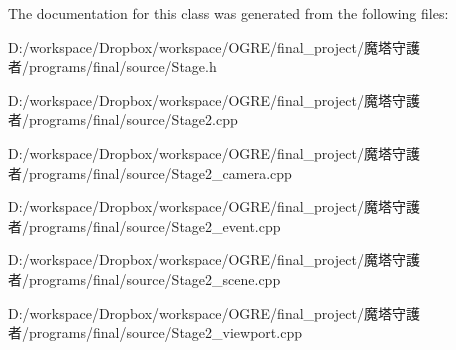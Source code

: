 The documentation for this class was generated from the following files:\begin{DoxyCompactItemize}
\item 
D:/workspace/Dropbox/workspace/OGRE/final\_\-project/魔塔守護者/programs/final/source/Stage.h\item 
D:/workspace/Dropbox/workspace/OGRE/final\_\-project/魔塔守護者/programs/final/source/Stage2.cpp\item 
D:/workspace/Dropbox/workspace/OGRE/final\_\-project/魔塔守護者/programs/final/source/Stage2\_\-camera.cpp\item 
D:/workspace/Dropbox/workspace/OGRE/final\_\-project/魔塔守護者/programs/final/source/Stage2\_\-event.cpp\item 
D:/workspace/Dropbox/workspace/OGRE/final\_\-project/魔塔守護者/programs/final/source/Stage2\_\-scene.cpp\item 
D:/workspace/Dropbox/workspace/OGRE/final\_\-project/魔塔守護者/programs/final/source/Stage2\_\-viewport.cpp\end{DoxyCompactItemize}
